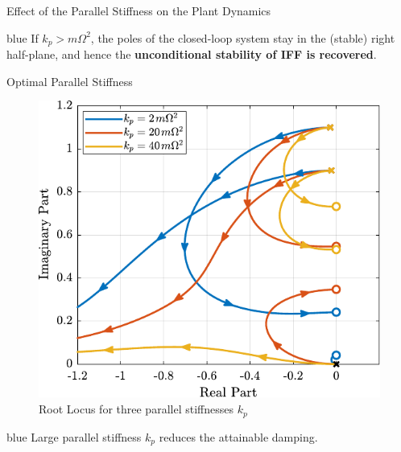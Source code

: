 \documentclass[t, minted]{clean-beamer}
\begin{document}
\begin{frame}[label={sec:org497c282}]{Effect of the Parallel Stiffness on the Plant Dynamics}
\vspace{1em}

\begin{cbox}[]{blue}{}
If \(k_p > m \Omega^2\), the poles of the closed-loop system stay in the (stable) right half-plane, and hence the \textbf{unconditional stability of IFF is recovered}.
\end{cbox}
\end{frame}

\begin{frame}[label={sec:orgd7eccc9}]{Optimal Parallel Stiffness}
\begin{figure}[htbp]
\centering
\includegraphics[width=0.60\linewidth]{figs/root_locus_iff_kps.pdf}
\caption{Root Locus for three parallel stiffnesses \(k_p\)}
\end{figure}

\begin{cbox}[]{blue}{}
\centering
Large parallel stiffness \(k_p\) reduces the attainable damping.
\end{cbox}
\end{frame}
\end{document}
